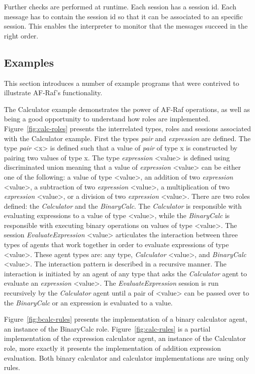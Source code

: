 \documentclass[a4paper,12pt,oneside,fleqn]{book} %
\begin{document}
Further checks are performed at runtime. Each session has a session id.
Each message has to contain the session id so that it can be associated to
an specific session. This enables the interpreter to monitor that the
messages succeed in the right order.


\subsection{Examples} %

This section introduces a number of example programs that were contrived to
illustrate AF-Raf's functionality.

The Calculator example demonstrates the power of AF-Raf operations, as well
as being a good opportunity to understand how roles are implemented.
Figure~\ref{fig:calc-roles} presents the interrelated types, roles and
sessions associated with the Calculator example. First the types
\textit{pair} and \textit{expression} are defined. The type \textit{pair}
<x> is defined such that a value of \textit{pair} of type x is constructed
by pairing two values of type x. The type \textit{expression} <value> is
defined using discriminated union meaning that a value of
\textit{expression} <value> can be either one of the following: a value of
type <value>, an addition of two \textit{expression} <value>, a subtraction
of two \textit{expression} <value>, a multiplication of two
\textit{expression} <value>, or a division of two \textit{expression}
<value>. There are two roles defined: the \textit{Calculator} and the
\textit{BinaryCalc}. The \textit{Calculator} is responsible with evaluating
expressions to a value of type <value>, while the \textit{BinaryCalc} is
responsible with executing binary operations on values of type <value>. The
session \textit{EvaluateExpression} <value> articulates the interaction
between three types of agents that work together in order to evaluate
expressions of type <value>. These agent types are: any type,
\textit{Calculator} <value>, and \textit{BinaryCalc} <value>. The
interaction pattern is described in a recursive manner. The interaction is
initiated by an agent of any type that asks the \textit{Calculator} agent
to evaluate an \textit{expression} <value>. The \textit{EvaluateExpression}
session is run recursively by the \textit{Calculator} agent until a pair of
<value> can be passed over to the \textit{BinaryCalc} or an expression is
evaluated to a value.

Figure~\ref{fig:bcalc-rules} presents the implementation of a binary
calculator agent, an instance of the BinaryCalc role.
Figure~\ref{fig:calc-rules} is a partial implementation of the expression
calculator agent, an instance of the Calculator role, more exactly it
presents the implementation of addition expression evaluation. Both binary
calculator and calculator implementations are using only rules.
\end{document}
